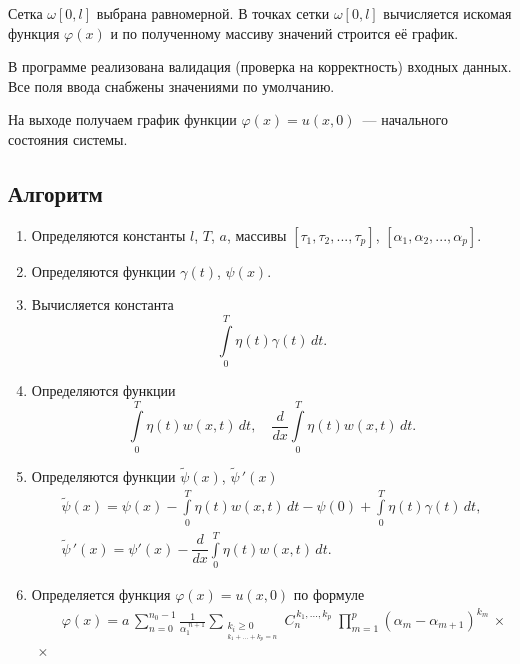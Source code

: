 \documentclass{article}
\renewcommand{\ge}{\geqslant}
\theoremstyle{definition}
\begin{document}
Сетка $\omega[0,l]$ выбрана равномерной. В точках сетки $\omega[0,l]$ вычисляется искомая функция $\varphi(x)$ и 
по полученному массиву значений строится её график.

В программе реализована валидация (проверка на корректность) входных данных. Все поля ввода снабжены значениями по умолчанию.

На выходе получаем график функции $\varphi(x) = u(x,0)$~--- начального состояния системы.


\subsection{Алгоритм}
\begin{enumerate}
	\item Определяются константы $l$, $T$, $a$, массивы $[\tau_1, \tau_2, ..., \tau_p]$, 
	$[\alpha_1, \alpha_2, ..., \alpha_p]$.
	\item Определяются функции $\gamma(t)$, $\psi(x)$.
	\item Вычисляется константа
	\begin{equation*}
		\int\limits_0^T \eta(t)\gamma(t) \,dt.
	\end{equation*}
	\item Определяются функции 
	\begin{equation*}
		\int\limits_0^T \eta(t)w(x,t) \,dt, \quad \dfrac{d}{dx}\int\limits_0^T \eta(t)w(x,t) \,dt.
	\end{equation*}
	\item Определяются функции $\widetilde{\psi}(x)$, $\widetilde{\psi}\,'(x)$ 
	\begin{gather*} \label{tilde_psi}
		\widetilde{\psi}(x) = \psi(x) - \int\limits_0^T \eta(t)w(x,t) \,dt - \psi(0) + \int\limits_0^T \eta(t)\gamma(t) \,dt, \\
		\widetilde{\psi}\,'(x) = \psi'(x) - \dfrac{d}{dx}\int\limits_0^T \eta(t)w(x,t) \,dt.
	\end{gather*}
	\item Определяется функция $\varphi(x) = u(x,0)$ по формуле
	\begin{equation*}
	\begin{aligned}
	& \varphi(x) = a\,\sum\limits_{n = 0}^{n_0 - 1} \frac{1}{\alpha_1^{\,\,n + 1}}
	\sum\limits_{\substack{{k_i \ge 0} \\_{k_1 + ... + k_p = n}}}\!\!\!\!C_n^{\,k_1, ..., k_p}\;
	\prod_{m = 1}^{p}(\alpha_m - \alpha_{m + 1})^{k_m} \,\times \\[2mm] \times\,

\end{aligned}
\end{equation*}
\end{enumerate}
\end{document}
